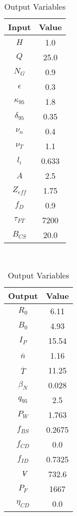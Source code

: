 \begin{table}[b!]
\centering
\caption{Proteus Variables}
\hfill
\begin{subtable}[t]{0.4\textwidth}
\centering
\caption{Input Variables} ~\\
\begin{tabular}{ c|c }

Input            & Value           \\
\hline
$H$              & 1.0              \\
$Q$              & 25.0             \\
$N_{G}$          & 0.9              \\
$\epsilon$       & 0.3              \\
$\kappa_{95}$    & 1.8              \\
$\delta_{95}$    & 0.35             \\
$\nu_{n}$        & 0.4              \\
$\nu_{T}$        & 1.1              \\
$l_{i}$          & 0.633         \\
$A$              & 2.5              \\
$Z_{eff}$        & 1.75             \\
$f_{D}$          & 0.9              \\
$\tau_{FT}$      & 7200           \\
$B_{CS}$         & 20.0             \\

\end{tabular}
\end{subtable}
\hfill
\begin{subtable}[t]{0.5\textwidth}
\centering
\caption{Output Variables} ~\\
\begin{tabular}{ c|c }

Output           & Value       \\
\hline
$R_{0}$          & 6.11             \\
$B_{0}$          & 4.93            \\
$I_{P}$          & 15.54            \\
$\overline n$    & 1.16            \\
$\overline T$    & 11.25            \\
$\beta_{N}$       & 0.028            \\
$q_{95}$         & 2.5              \\
$P_{W}$          & 1.763            \\
$f_{BS}$         & 0.2675           \\
$f_{CD}$         & 0.0              \\
$f_{ID}$         & 0.7325           \\
$\volume$         & 732.6            \\
$P_{F}$          & 1667           \\
$\eta_{CD}$      & 0.0              \\


\end{tabular}
\end{subtable}
\end{table}
